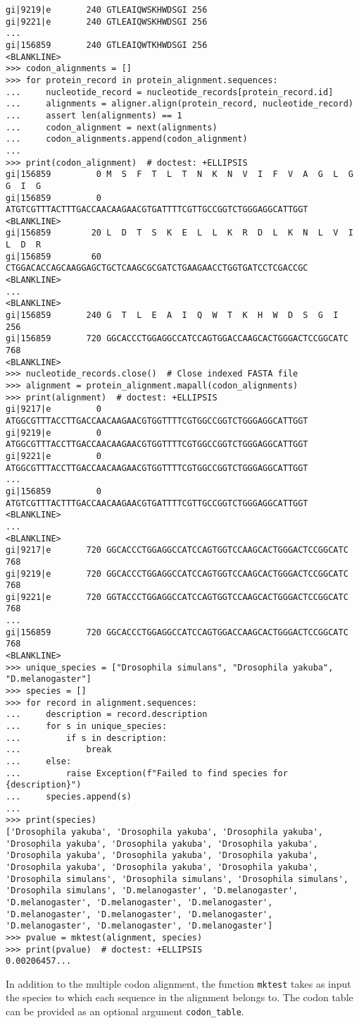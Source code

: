 \begin{verbatim}
gi|9219|e       240 GTLEAIQWSKHWDSGI 256
gi|9221|e       240 GTLEAIQWSKHWDSGI 256
...
gi|156859       240 GTLEAIQWTKHWDSGI 256
<BLANKLINE>
>>> codon_alignments = []
>>> for protein_record in protein_alignment.sequences:
...     nucleotide_record = nucleotide_records[protein_record.id]
...     alignments = aligner.align(protein_record, nucleotide_record)
...     assert len(alignments) == 1
...     codon_alignment = next(alignments)
...     codon_alignments.append(codon_alignment)
...
>>> print(codon_alignment)  # doctest: +ELLIPSIS
gi|156859         0 M  S  F  T  L  T  N  K  N  V  I  F  V  A  G  L  G  G  I  G  
gi|156859         0 ATGTCGTTTACTTTGACCAACAAGAACGTGATTTTCGTTGCCGGTCTGGGAGGCATTGGT
<BLANKLINE>
gi|156859        20 L  D  T  S  K  E  L  L  K  R  D  L  K  N  L  V  I  L  D  R  
gi|156859        60 CTGGACACCAGCAAGGAGCTGCTCAAGCGCGATCTGAAGAACCTGGTGATCCTCGACCGC
<BLANKLINE>
...
<BLANKLINE>
gi|156859       240 G  T  L  E  A  I  Q  W  T  K  H  W  D  S  G  I   256
gi|156859       720 GGCACCCTGGAGGCCATCCAGTGGACCAAGCACTGGGACTCCGGCATC 768
<BLANKLINE>
>>> nucleotide_records.close()  # Close indexed FASTA file
>>> alignment = protein_alignment.mapall(codon_alignments)
>>> print(alignment)  # doctest: +ELLIPSIS
gi|9217|e         0 ATGGCGTTTACCTTGACCAACAAGAACGTGGTTTTCGTGGCCGGTCTGGGAGGCATTGGT
gi|9219|e         0 ATGGCGTTTACCTTGACCAACAAGAACGTGGTTTTCGTGGCCGGTCTGGGAGGCATTGGT
gi|9221|e         0 ATGGCGTTTACCTTGACCAACAAGAACGTGGTTTTCGTGGCCGGTCTGGGAGGCATTGGT
...
gi|156859         0 ATGTCGTTTACTTTGACCAACAAGAACGTGATTTTCGTTGCCGGTCTGGGAGGCATTGGT
<BLANKLINE>
...
<BLANKLINE>
gi|9217|e       720 GGCACCCTGGAGGCCATCCAGTGGTCCAAGCACTGGGACTCCGGCATC 768
gi|9219|e       720 GGCACCCTGGAGGCCATCCAGTGGTCCAAGCACTGGGACTCCGGCATC 768
gi|9221|e       720 GGTACCCTGGAGGCCATCCAGTGGTCCAAGCACTGGGACTCCGGCATC 768
...
gi|156859       720 GGCACCCTGGAGGCCATCCAGTGGACCAAGCACTGGGACTCCGGCATC 768
<BLANKLINE>
>>> unique_species = ["Drosophila simulans", "Drosophila yakuba", "D.melanogaster"]
>>> species = []
>>> for record in alignment.sequences:
...     description = record.description
...     for s in unique_species:
...         if s in description:
...             break
...     else:
...         raise Exception(f"Failed to find species for {description}")
...     species.append(s)
...
>>> print(species)
['Drosophila yakuba', 'Drosophila yakuba', 'Drosophila yakuba', 'Drosophila yakuba', 'Drosophila yakuba', 'Drosophila yakuba', 'Drosophila yakuba', 'Drosophila yakuba', 'Drosophila yakuba', 'Drosophila yakuba', 'Drosophila yakuba', 'Drosophila yakuba', 'Drosophila simulans', 'Drosophila simulans', 'Drosophila simulans', 'Drosophila simulans', 'D.melanogaster', 'D.melanogaster', 'D.melanogaster', 'D.melanogaster', 'D.melanogaster', 'D.melanogaster', 'D.melanogaster', 'D.melanogaster', 'D.melanogaster', 'D.melanogaster', 'D.melanogaster']
>>> pvalue = mktest(alignment, species)
>>> print(pvalue)  # doctest: +ELLIPSIS
0.00206457...
\end{verbatim}
In addition to the multiple codon alignment, the function \verb+mktest+ takes as input the species to which each sequence in the alignment belongs to. The codon table can be provided as an optional argument \verb+codon_table+.

